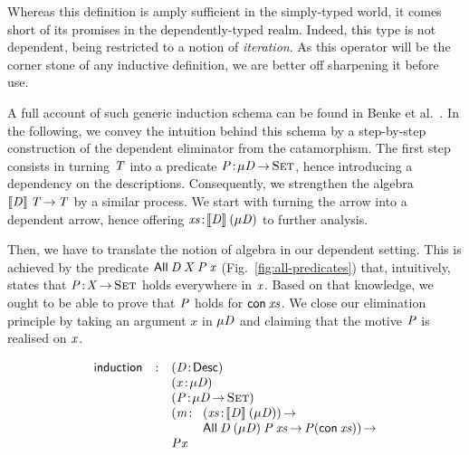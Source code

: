 Whereas this definition is amply sufficient in the simply-typed world,
it comes short of its promises in the dependently-typed realm. Indeed,
this type is not dependent, being restricted to a notion of
\emph{iteration}. As this operator will be the corner stone of any
inductive definition, we are better off sharpening it before use.

A full account of such generic induction schema can be found in Benke
et al.~\cite{benke:universe-generic-prog,
  dybjer:ir-initial-algebra}. In the following, we convey the
intuition behind this schema by a step-by-step construction of the
dependent eliminator from the catamorphism. The first step consists in
turning $\V{T}$ into a predicate $\Bhab{\V{P}}{\Mu{\V{D}} \To \Set}$,
hence introducing a dependency on the descriptions. Consequently, we
strengthen the algebra $\descop{\V{D}}{\V{T}} \To \V{T}$ by a similar
process. We start with turning the arrow into a dependent arrow, hence
offering $\Bhab{\V{xs}}{\descop{\V{D}}{(\Mu{\V{D}})}}$ to further
analysis.

Then, we have to translate the notion of algebra in our dependent
setting. This is achieved by the predicate $\All{\V{D}}{\V{X}}{\V{P}}{\V{x}}$
(Fig.~\ref{fig:all-predicates}) that, intuitively, states that
$\Bhab{\V{P}}{\V{X} \To \Set}$ holds everywhere in $\V{x}$. Based on that
knowledge, we ought to be able to prove that $\V{P}$ holds for
$\Con{\V{xs}}$. We close our elimination principle by taking an argument
$x$ in $\Mu{\V{D}}$ and claiming that the motive $\V{P}$ is realised on $\V{x}$.

\[
\begin{array}{lcll}
\F{induction} & : & \multicolumn{2}{l}{\PITEL{\V{D}}{\Desc}}                   \\
              &   & \multicolumn{2}{l}{\PITEL{\V{x}}{\Mu{\V{D}}}}                   \\
              &   & \multicolumn{2}{l}{\PITEL{\V{P}}{\Mu{\V{D}} \To \Set}}         \\
              &   & \PI{\V{m}}{& \PI{\V{xs}}{\descop{\V{D}}{(\Mu{\V{D}})}}              \\
              &   &           & \All{\V{D}}{(\Mu{\V{D}})}{\V{P}}{\V{xs}} \To \V{P} (\Con{\V{xs}})} \\
              &   & \V{P} \V{x}
\end{array}
\]

